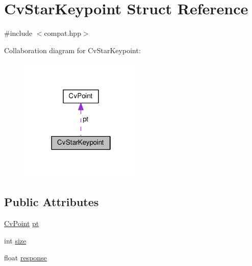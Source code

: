 \hypertarget{structCvStarKeypoint}{\section{Cv\-Star\-Keypoint Struct Reference}
\label{structCvStarKeypoint}
}


{\ttfamily \#include $<$compat.\-hpp$>$}



Collaboration diagram for Cv\-Star\-Keypoint\-:\nopagebreak
\begin{figure}[H]
\begin{center}
\leavevmode
\includegraphics[width=166pt]{structCvStarKeypoint__coll__graph}
\end{center}
\end{figure}
\subsection*{Public Attributes}
\begin{DoxyCompactItemize}
\item 
\hyperlink{structCvPoint}{Cv\-Point} \hyperlink{structCvStarKeypoint_a11e9bdef9f976cd6efd52f15528202f7}{pt}
\item 
int \hyperlink{structCvStarKeypoint_a484ba003548660389a9b547618f23a8b}{size}
\item 
float \hyperlink{structCvStarKeypoint_a1f824a700a88dd7f8c0114292626cae0}{response}
\end{DoxyCompactItemize}



